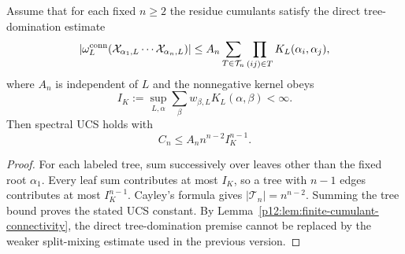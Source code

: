 \documentclass[12pt,a4paper]{article}
\begin{document}
\begin{lemma}
\label{p12:lem:ucs-tree-bound}
Assume that for each fixed \(n\ge2\) the residue cumulants satisfy the direct tree-domination estimate
\begin{equation}
\label{p12:eq:ucs-tree-bound}
|\omega_L^{\rm conn}(\mathcal X_{\alpha_1,L}\cdots\mathcal X_{\alpha_n,L})|
\le A_n\sum_{T\in\mathcal T_n}\prod_{(ij)\in T}K_L(\alpha_i,\alpha_j),
\end{equation}
where \(A_n\) is independent of \(L\) and the nonnegative kernel obeys
\[
I_K:=\sup_{L,\alpha}\sum_\beta w_{\beta,L}K_L(\alpha,\beta)<\infty.
\]
Then spectral UCS holds with
\[
C_n\le A_n n^{n-2}I_K^{n-1}.
\]
\end{lemma}
\begin{proof}
For each labeled tree, sum successively over leaves other than the fixed root \(\alpha_1\).  Every leaf sum contributes at most \(I_K\), so a tree with \(n-1\) edges contributes at most \(I_K^{n-1}\).  Cayley's formula gives \(|\mathcal T_n|=n^{n-2}\).  Summing the tree bound proves the stated UCS constant.  By Lemma~\ref{p12:lem:finite-cumulant-connectivity}, the direct tree-domination premise cannot be replaced by the weaker split-mixing estimate used in the previous version.
\end{proof}
\end{document}
